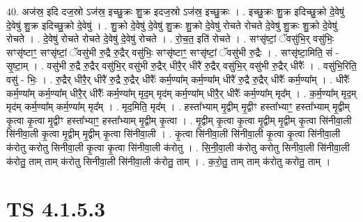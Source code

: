\documentclass[17pt]{extarticle}
\begin{document}
40. अज॑स्र॒ इदि दज॒स्रो ऽज॑स्र॒ इच्छु॒क्रः शु॒क्र इदज॒स्रो ऽज॑स्र॒ इच्छु॒क्रः । . इच्छु॒क्रः शु॒क्र इदिच्छु॒क्रो दे॒वेषु॑ दे॒वेषु॑ शु॒क्र इदिच्छु॒क्रो दे॒वेषु॑ । . शु॒क्रो दे॒वेषु॑ दे॒वेषु॑ शु॒क्रः शु॒क्रो दे॒वेषु॑ रोचते रोचते दे॒वेषु॑ शु॒क्रः शु॒क्रो दे॒वेषु॑ रोचते । . दे॒वेषु॑ रोचते रोचते दे॒वेषु॑ दे॒वेषु॑ रोचते । . रो॒च॒त॒ इति॑ रोचते । . सꣳसृ॑ष्टां॒ ॅवसु॑भि॒र् वसु॑भिः॒ सꣳसृ॑ष्टाꣳ॒॒ सꣳसृ॑ष्टां॒ ॅवसु॑भी रु॒द्रै रु॒द्रैर् वसु॑भिः॒ सꣳसृ॑ष्टाꣳ॒॒ सꣳसृ॑ष्टां॒ ॅवसु॑भी रु॒द्रैः । . सꣳसृ॑ष्टा॒मिति॒ सं - सृ॒ष्टा॒म् । . वसु॑भी रु॒द्रै रु॒द्रैर् वसु॑भि॒र् वसु॑भी रु॒द्रैर् धीरै॒र् धीरै॑ रु॒द्रैर् वसु॑भि॒र् वसु॑भी रु॒द्रैर् धीरैः᳚ । . वसु॑भि॒रिति॒ वसु॑ - भिः॒ । . रु॒द्रैर् धीरै॒र् धीरै॑ रु॒द्रै रु॒द्रैर् धीरैः᳚ कर्म॒ण्या᳚म् कर्म॒ण्या᳚म् धीरै॑ रु॒द्रै रु॒द्रैर् धीरैः᳚ कर्म॒ण्या᳚म् । . धीरैः᳚ कर्म॒ण्या᳚म् कर्म॒ण्या᳚म् धीरै॒र् धीरैः᳚ कर्म॒ण्या᳚म् मृद॒म् मृद॑म् कर्म॒ण्या᳚म् धीरै॒र् धीरैः᳚ कर्म॒ण्या᳚म् मृद᳚म् । . क॒र्म॒ण्या᳚म् मृद॒म् मृद॑म् कर्म॒ण्या᳚म् कर्म॒ण्या᳚म् मृद᳚म् । . मृद॒मिति॒ मृद᳚म् । . हस्ता᳚भ्याम् मृ॒द्वीम् मृ॒द्वीꣳ हस्ता᳚भ्याꣳ॒॒ हस्ता᳚भ्याम् मृ॒द्वीम् कृ॒त्वा कृ॒त्वा मृ॒द्वीꣳ हस्ता᳚भ्याꣳ॒॒ हस्ता᳚भ्याम् मृ॒द्वीम् कृ॒त्वा । . मृ॒द्वीम् कृ॒त्वा कृ॒त्वा मृ॒द्वीम् मृ॒द्वीम् कृ॒त्वा सि॑नीवा॒ली सि॑नीवा॒ली कृ॒त्वा मृ॒द्वीम् मृ॒द्वीम् कृ॒त्वा सि॑नीवा॒ली । . कृ॒त्वा सि॑नीवा॒ली सि॑नीवा॒ली कृ॒त्वा कृ॒त्वा सि॑नीवा॒ली क॑रोतु करोतु सिनीवा॒ली कृ॒त्वा कृ॒त्वा सि॑नीवा॒ली क॑रोतु । . सि॒नी॒वा॒ली क॑रोतु करोतु सिनीवा॒ली सि॑नीवा॒ली क॑रोतु॒ ताम् ताम् क॑रोतु सिनीवा॒ली सि॑नीवा॒ली क॑रोतु॒ ताम् । . क॒रो॒तु॒ ताम् ताम् क॑रोतु करोतु॒ ताम् । \newline
\pagebreak
{}

\section{ TS 4.1.5.3 }
\end{document}

